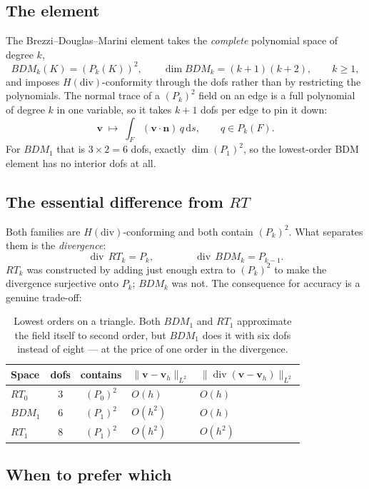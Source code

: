 \documentclass[11pt,a4paper]{article}
\newcommand{\Hdiv}{H(\mathrm{div})}
\newcommand{\dv}{\operatorname{div}}
\newcommand{\ds}{\,\mathrm{d}s}
\newcommand{\bn}{\mathbf{n}}
\newcommand{\bv}{\mathbf{v}}
\begin{document}
\subsection{The element}

The Brezzi--Douglas--Marini element takes the \emph{complete} polynomial space
of degree $k$,
\[
  BDM_k(K) = (P_k(K))^2, \qquad \dim BDM_k = (k+1)(k+2), \qquad k \ge 1,
\]
and imposes $\Hdiv$-conformity through the dofs rather than by restricting the
polynomials. The normal trace of a $(P_k)^2$ field on an edge is a full
polynomial of degree $k$ in one variable, so it takes $k+1$ dofs per edge to pin
it down:
\[
  \bv \;\longmapsto\; \int_{F} (\bv\cdot\bn)\, q \ds, \qquad q \in P_k(F).
\]
For $BDM_1$ that is $3 \times 2 = 6$ dofs, exactly $\dim (P_1)^2$, so the
lowest-order BDM element has no interior dofs at all.

\subsection{The essential difference from $RT$}

Both families are $\Hdiv$-conforming and both contain $(P_k)^2$. What separates
them is the \emph{divergence}:
\[
  \dv\, RT_k = P_k, \qquad\qquad \dv\, BDM_k = P_{k-1}.
\]
$RT_k$ was constructed by adding just enough extra to $(P_k)^2$ to make the
divergence surjective onto $P_k$; $BDM_k$ was not. The consequence for accuracy
is a genuine trade-off:

\begin{table}[htbp]
\centering
\small
\caption{Lowest orders on a triangle. Both $BDM_1$ and $RT_1$ approximate the
field itself to second order, but $BDM_1$ does it with six dofs instead of
eight --- at the price of one order in the divergence.}
\label{tab:rtbdm}
\begin{tabular}{@{}lccll@{}}
\toprule
Space & dofs & contains & $\|\bv - \bv_h\|_{L^2}$ & $\|\dv(\bv - \bv_h)\|_{L^2}$ \\
\midrule
$RT_0$   & 3 & $(P_0)^2$ & $O(h)$   & $O(h)$   \\
$BDM_1$  & 6 & $(P_1)^2$ & $O(h^2)$ & $O(h)$   \\
$RT_1$   & 8 & $(P_1)^2$ & $O(h^2)$ & $O(h^2)$ \\
\bottomrule
\end{tabular}
\end{table}

\subsection{When to prefer which}
\end{document}
